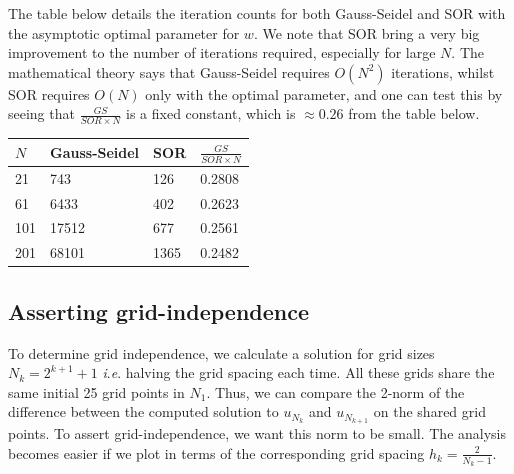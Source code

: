 \documentclass{article}
\numberwithin{equation}{section}
\theoremstyle{definition}
\newcommand{\ie}{\textit{i}.\textit{e}. }
\begin{document}
The table below details the iteration counts for both Gauss-Seidel and SOR with the asymptotic optimal parameter for $w$. We note that SOR bring a very big improvement to the number of iterations required, especially for large $N$. The mathematical theory says that Gauss-Seidel requires $O(N^2)$ iterations, whilst SOR requires $O(N)$ only with the optimal parameter, and one can test this by seeing that $\frac{GS}{SOR \times N}$ is a fixed constant, which is $\approx 0.26$ from the table below.

\begin{table}[H]
    \centering
    \begin{tabular}{|m{2.159cm}|m{2.159cm}|m{2.159cm}|m{2.159cm}|}
    \hline
    $N$ & Gauss-Seidel & SOR & $\frac{GS}{SOR \times N}$ \\ \hline
    21  & 743          & 126 & 0.2808 \\ \hline
    61  & 6433         & 402 & 0.2623 \\ \hline
    101 & 17512        & 677 & 0.2561 \\ \hline
    201 & 68101        & 1365 & 0.2482 \\ \hline
    \end{tabular}
    \end{table}

\subsection{Asserting grid-independence}
To determine grid independence, we calculate a solution for grid sizes $N_k = 2^{k+1}+1$ \ie halving the grid spacing each time. All these grids share the same initial 25 grid points in $N_1$. Thus, we can compare the 2-norm of the difference between the computed solution to $u_{N_k}$ and $u_{N_{k+1}}$ on the shared grid points. To assert grid-independence, we want this norm to be small. The analysis becomes easier if we plot in terms of the corresponding grid spacing $h_k = \frac{2}{N_k - 1}$.
\end{document}
